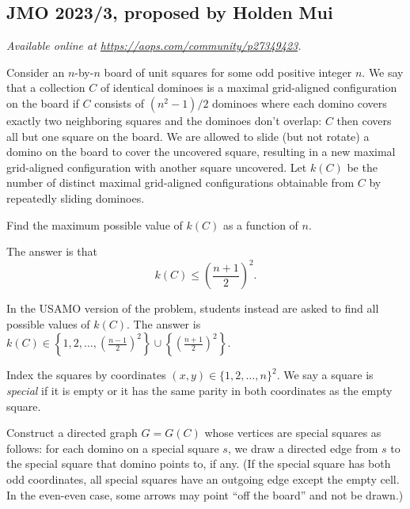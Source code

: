 \documentclass[11pt]{scrartcl}
\begin{document}
\subsection{JMO 2023/3, proposed by Holden Mui}
\textsl{Available online at \url{https://aops.com/community/p27349423}.}
\begin{mdframed}[style=mdpurplebox,frametitle={Problem statement}]
Consider an $n$-by-$n$ board of unit squares for some odd positive integer $n$.
We say that a collection $C$ of identical dominoes is a
maximal grid-aligned configuration on the board if $C$ consists of $(n^2-1)/2$
dominoes where each domino covers exactly two neighboring squares
and the dominoes don't overlap: $C$ then covers all but one square on the board.
We are allowed to slide (but not rotate) a domino on the board to
cover the uncovered square, resulting in a new maximal grid-aligned configuration
with another square uncovered. Let $k(C)$ be the number of distinct maximal
grid-aligned configurations obtainable from $C$ by repeatedly sliding dominoes.

Find the maximum possible value of $k(C)$ as a function of $n$.
\end{mdframed}
The answer is that
\[ k(C) \le \left( \frac{n+1}{2} \right)^2. \]
\begin{remark*}
  In the USAMO version of the problem,
  students instead are asked to find all possible values of $k(C)$.
  The answer is
  $k(C) \in \left\{ 1, 2, \dots, \left( \frac{n-1}{2} \right)^2 \right\}
  \cup \left\{ \left( \frac{n+1}{2} \right)^2 \right\}$.
\end{remark*}

Index the squares by coordinates $(x,y) \in \{1,2,\dots,n\}^2$.
We say a square is \emph{special} if it is empty or
it has the same parity in both coordinates as the empty square.

Construct a directed graph $G = G(C)$ whose vertices are special squares as follows:
for each domino on a special square $s$, we draw a directed edge
from $s$ to the special square that domino points to, if any.
(If the special square has both odd coordinates,
all special squares have an outgoing edge except the empty cell.
In the even-even case, some arrows may point ``off the board''
and not be drawn.)
\end{document}
